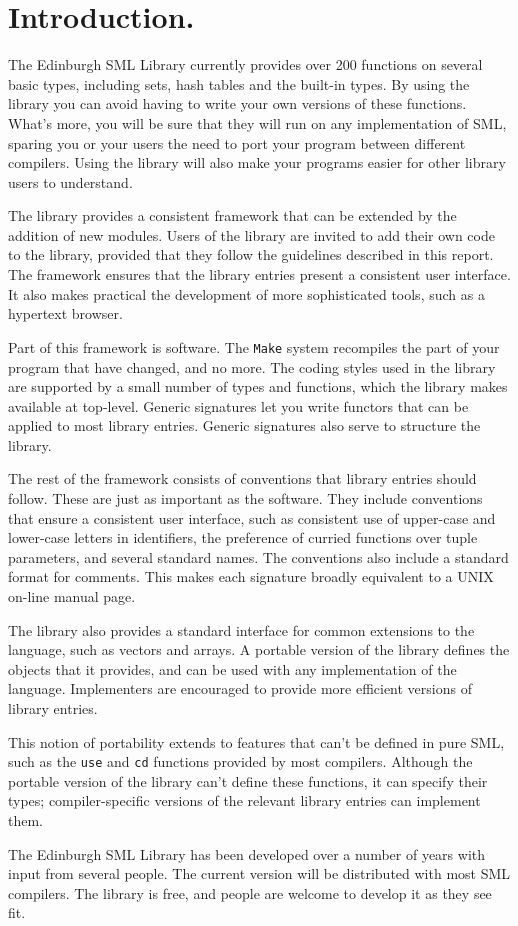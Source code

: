 %
%

\chapter{Introduction.}

The Edinburgh SML Library currently provides over 200 functions
on several basic types, including sets, hash tables and the built-in types.
By using the library you can avoid having to
write your own versions of these functions.  What's more, you will be
sure that they will run on any implementation of SML, sparing you or your
users the need to port your program between different compilers.  Using
the library will also make your programs easier for other library users
to understand.

The library provides a consistent framework that can be extended by
the addition of new modules.  Users of the library are invited to
add their own code to the library, provided that they follow the
guidelines described in this report.  The framework ensures that the
library entries present a consistent user interface.  It also makes
practical the development of more sophisticated tools, such as a
hypertext browser.

Part of this framework is software.
The {\tt Make} system recompiles
the part of your program that have changed, and no more. The coding styles
used in the library are supported by a small number of types and functions,
which the library makes available at top-level. Generic signatures let
you write functors that can be applied to most library entries.
Generic signatures also serve to structure the library.

The rest of the framework consists of conventions that library entries
should follow. These are just as important as the software. They include
conventions that ensure a consistent user interface, such as consistent
use of upper-case and lower-case letters in identifiers, the preference of
curried functions over tuple parameters, and several standard names.
The conventions also include a standard format for comments. This makes
each signature broadly equivalent to a UNIX on-line manual page.

The library also provides a standard interface for
common extensions to the language, such as vectors and arrays.
A portable version of the library defines the objects that
it provides, and can be used with any implementation of the language.
Implementers are encouraged to provide more efficient versions
of library entries.

This notion of portability extends to features that can't be defined
in pure SML, such as the {\tt use} and {\tt cd} functions provided by
most compilers.  Although the portable version of the library
can't define these functions, it can specify their types;
compiler-specific versions of the relevant library entries can
implement them.

The Edinburgh SML Library has been developed over a number of years with
input from several people.  The current version will be distributed
with most SML compilers.  The library is free, and people are welcome
to develop it as they see fit.
